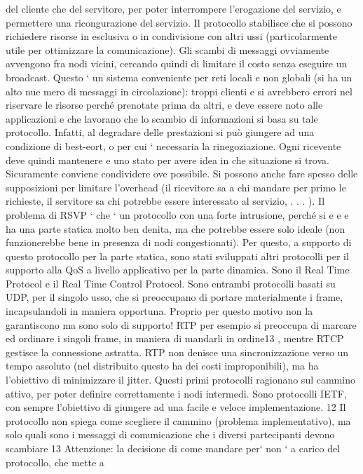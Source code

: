 \documentclass[a4paper,12pt]{article}
\begin{document}
del cliente che del servitore, per poter interrompere l'erogazione del servizio,
e permettere una ricongurazione del servizio. Il protocollo stabilisce che si
possono richiedere risorse in esclusiva o in condivisione con altri ussi (particolarmente utile per ottimizzare la
comunicazione). Gli scambi di messaggi
ovviamente avvengono fra nodi vicini, cercando quindi di limitare il costo senza
eseguire un broadcast.
Questo ` un sistema conveniente per reti locali e non globali (si ha un alto nue
mero di messaggi in circolazione): troppi clienti e si avrebbero errori nel riservare
le risorse perché prenotate prima da altri, e deve essere noto alle applicazioni
e
che lavorano che lo scambio di informazioni si basa su tale protocollo. Infatti,
al degradare delle prestazioni si può giungere ad una condizione di best-eort,
o
per cui ` necessaria la rinegoziazione. Ogni ricevente deve quindi mantenere
e
uno stato per avere idea in che situazione si trova. Sicuramente conviene condividere ove possibile. Si possono anche
fare spesso delle supposizioni per limitare
l'overhead (il ricevitore sa a chi mandare per primo le richieste, il servitore sa
chi potrebbe essere interessato al servizio, . . . ).
Il problema di RSVP ` che ` un protocollo con una forte intrusione, perché si
e
e
e
ha una parte statica molto ben denita, ma che potrebbe essere solo ideale (non
funzionerebbe bene in presenza di nodi congestionati). Per questo, a supporto
di questo protocollo per la parte statica, sono stati sviluppati altri protocolli
per il supporto alla QoS a livello applicativo per la parte dinamica. Sono il Real
Time Protocol e il Real Time Control Protocol. Sono entrambi protocolli basati
su UDP, per il singolo usso, che si preoccupano di portare materialmente i
frame, incapsulandoli in maniera opportuna. Proprio per questo motivo non
la garantiscono ma sono solo di supporto! RTP per esempio si preoccupa di
marcare ed ordinare i singoli frame, in maniera di mandarli in ordine13 , mentre
RTCP gestisce la connessione astratta.
RTP non denisce una sincronizzazione verso un tempo assoluto (nel distribuito questo ha dei costi improponibili), ma ha
l'obiettivo di minimizzare il
jitter. Questi primi protocolli ragionano sul cammino attivo, per poter definire
correttamente i nodi intermedi. Sono protocolli IETF, con sempre l'obiettivo di
giungere ad una facile e veloce implementazione.
12 Il protocollo non spiega come scegliere il cammino (problema implementativo), ma solo
quali sono i messaggi di comunicazione che i diversi partecipanti devono scambiare
13 Attenzione: la decisione di come mandare per` non ` a carico del protocollo, che mette a
\end{document}
